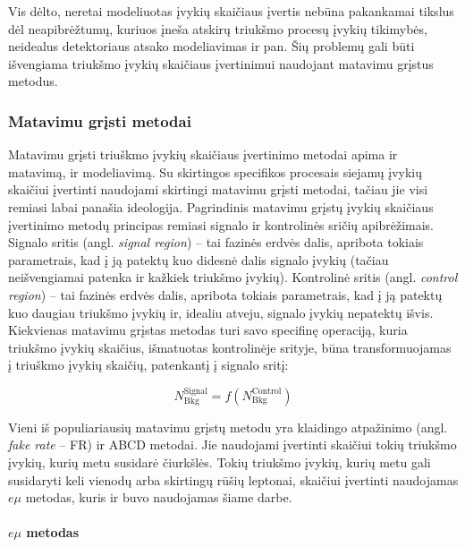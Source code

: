 \documentclass[a4paper, 12pt]{article}
\newcommand{\emu}{e\mu}
\newlength\q
\begin{document}
Vis dėlto, neretai modeliuotas įvykių skaičiaus įvertis nebūna pakankamai tikslus dėl
neapibrėžtumų, kuriuos įneša atskirų triukšmo procesų įvykių tikimybės, neidealus detektoriaus
atsako modeliavimas ir pan.
Šių problemų gali būti išvengiama triukšmo įvykių skaičiaus įvertinimui naudojant matavimu
grįstus metodus.

\subsubsection*{Matavimu grįsti metodai}

Matavimu grįsti triuškmo įvykių skaičiaus įvertinimo metodai apima ir matavimą, ir modeliavimą.
Su skirtingos specifikos procesais siejamų įvykių skaičiui įvertinti naudojami skirtingi
matavimu grįsti metodai, tačiau jie visi remiasi labai panašia ideologija.
Pagrindinis matavimu grįstų įvykių skaičiaus įvertinimo metodų principas remiasi signalo ir
kontrolinės sričių apibrėžimais.
Signalo sritis (angl. \textit{signal region}) -- tai fazinės erdvės dalis, apribota tokiais
parametrais, kad į ją patektų kuo didesnė dalis signalo įvykių (tačiau neišvengiamai patenka
ir kažkiek triukšmo įvykių).
Kontrolinė sritis (angl. \textit{control region}) -- tai fazinės erdvės dalis, apribota
tokiais parametrais, kad į ją patektų kuo daugiau triukšmo įvykių ir, idealiu atveju, signalo
įvykių nepatektų išvis.
Kiekvienas matavimu grįstas metodas turi savo specifinę operaciją, kuria triukšmo įvykių skaičius,
išmatuotas kontrolinėje srityje, būna transformuojamas į triuškmo įvykių skaičių, patenkantį į
signalo sritį:

\begin{equation}
	N_{\mathrm{Bkg}}^{\mathrm{Signal}} = f( N_{\mathrm{Bkg}}^{\mathrm{Control}} )
	\label{eq:data-driven}
\end{equation}

Vieni iš populiariausių matavimu grįstų metodu yra klaidingo atpažinimo (angl.
\textit{fake rate} -- FR) ir ABCD metodai.
Jie naudojami įvertinti skaičiui tokių triukšmo įvykių, kurių metu susidarė čiurkšlės.
Tokių triukšmo įvykių, kurių metu gali susidaryti keli vienodų arba skirtingų
rūšių leptonai, skaičiui įvertinti naudojamas $\emu$ metodas, kuris ir buvo naudojamas šiame
darbe.

\paragraph{$e\mu$ metodas\\}
\end{document}
